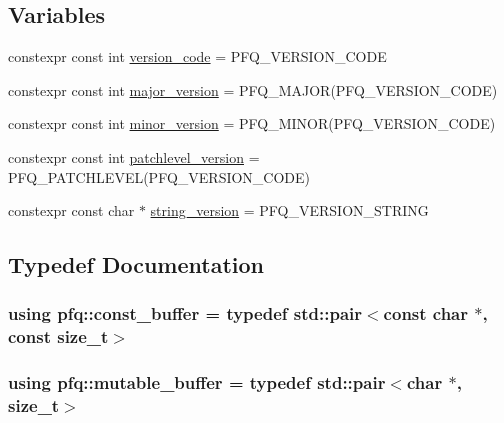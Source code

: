 \subsection*{Variables}
\begin{DoxyCompactItemize}
\item 
constexpr const int \hyperlink{namespacepfq_a7a40dd66aee22cafaf240382a6d965ab}{version\+\_\+code} = P\+F\+Q\+\_\+\+V\+E\+R\+S\+I\+O\+N\+\_\+\+C\+O\+DE
\item 
constexpr const int \hyperlink{namespacepfq_a5edeb73b0430a772b181d778b1c90bbc}{major\+\_\+version} = P\+F\+Q\+\_\+\+M\+A\+J\+OR(P\+F\+Q\+\_\+\+V\+E\+R\+S\+I\+O\+N\+\_\+\+C\+O\+DE)
\item 
constexpr const int \hyperlink{namespacepfq_a7f444700f822d8632dee37560ab76a7b}{minor\+\_\+version} = P\+F\+Q\+\_\+\+M\+I\+N\+OR(P\+F\+Q\+\_\+\+V\+E\+R\+S\+I\+O\+N\+\_\+\+C\+O\+DE)
\item 
constexpr const int \hyperlink{namespacepfq_aa1b1daa6a96155899c26c206325e97a9}{patchlevel\+\_\+version} = P\+F\+Q\+\_\+\+P\+A\+T\+C\+H\+L\+E\+V\+EL(P\+F\+Q\+\_\+\+V\+E\+R\+S\+I\+O\+N\+\_\+\+C\+O\+DE)
\item 
constexpr const char $\ast$ \hyperlink{namespacepfq_a30c944a281046dafc6e1cd2629cc6e15}{string\+\_\+version} = P\+F\+Q\+\_\+\+V\+E\+R\+S\+I\+O\+N\+\_\+\+S\+T\+R\+I\+NG
\end{DoxyCompactItemize}


\subsection{Typedef Documentation}
\subsubsection[{\texorpdfstring{const\+\_\+buffer}{const_buffer}}]{\setlength{\rightskip}{0pt plus 5cm}using {\bf pfq\+::const\+\_\+buffer} = typedef std\+::pair$<$const char $\ast$, const size\+\_\+t$>$}\hypertarget{namespacepfq_ac835a1bd09b4cbaba61c100b50d0a99f}{}\label{namespacepfq_ac835a1bd09b4cbaba61c100b50d0a99f}
\subsubsection[{\texorpdfstring{mutable\+\_\+buffer}{mutable_buffer}}]{\setlength{\rightskip}{0pt plus 5cm}using {\bf pfq\+::mutable\+\_\+buffer} = typedef std\+::pair$<$char $\ast$, size\+\_\+t$>$}\hypertarget{namespacepfq_ad7b88920eaf729154354741132483ea8}{}\label{namespacepfq_ad7b88920eaf729154354741132483ea8}


